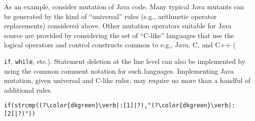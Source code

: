 \documentclass[sigconf,review, anonymous]{acmart}
\begin{document}
As an
example, consider mutation of Java code.  Many typical Java mutants can be
generated by the kind of ``universal'' rules (e.g., arithmetic
operator replacements) considered above.  Other mutation operators
suitable for Java source are provided by considering the set of
``C-like'' languages that use the logical operators and control
constructs common to e.g.,  Java, C, and C++ ({{\tt if}, {\tt while},
  etc.).  Statement deletion at the line level can also be implemented
  by using the common comment notation for such languages.
  Implementing Java mutation, given universal and C-like rules, may
  require no more than a handful of additional rules.

\lstset{style=cstyle}

\begin{lstlisting}[basicstyle=\footnotesize\ttfamily,numbers=none]
if(strcmp((?\color{dkgreen}\verb|:[1]|?),"(?\color{dkgreen}\verb|:[2]|?)"))
\end{lstlisting}


}
\end{document}

